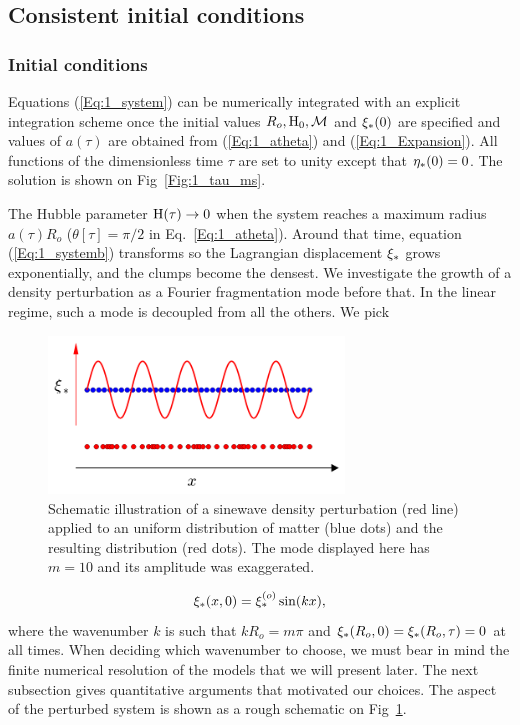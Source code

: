 \subsection{Consistent initial conditions} 
\subsubsection{Initial conditions} 
Equations (\ref{Eq:1_system}) can be numerically integrated with an explicit integration scheme once the initial values $R_o, {\textrm{H}}_0, {\cal M}$ and $\xi_\ast(0)$ are specified and values of $a(\tau)$ are obtained from (\ref{Eq:1_atheta}) and (\ref{Eq:1_Expansion}). All functions of the dimensionless time $\tau$ are set to unity except that $\eta_\ast(0) = 0$. The solution is shown on Fig~\ref{Fig:1_tau_ms}.


The Hubble parameter ${\textrm{H}}(\tau) \rightarrow 0$ when the system reaches a maximum radius $a(\tau)R_o$ ($\theta[\tau] = \pi/2$ in Eq.~\ref{Eq:1_atheta}). Around that time, equation (\ref{Eq:1_systemb}) transforms so the Lagrangian displacement $\xi_\ast$ grows exponentially, and the clumps become the densest. We investigate the growth of a density perturbation as a Fourier fragmentation mode before that. In the linear regime, such a mode is decoupled from all the others. We pick 

 \begin{figure}
	\center
 	\includegraphics[width=0.7\textwidth]{Figures/1_perturbation.png}
	\caption{Schematic illustration of a sinewave density perturbation (red line) applied to an uniform distribution of matter (blue dots) and the resulting distribution (red dots). The mode displayed here has $m=10$ and its amplitude was exaggerated.} 
	\label{Fig:1_perturbation}
\end{figure}

\begin{equation} 
\label{Eq:1_FourierMode} 
   \xi_\ast(x,0) = \xi_\ast^{(o)} \sin( kx ) ,
\end{equation}  
where the wavenumber $k$ is such that $k R_o = m \pi$ and $\xi_\ast(R_o,0) = \xi_\ast(R_o,\tau) = 0$ at all times. When deciding which wavenumber to choose, we must bear in mind the finite numerical resolution of the models that we will present later. The next subsection gives quantitative arguments that motivated our choices.  
The aspect of the perturbed system is shown as a rough schematic on Fig~\ref{Fig:1_perturbation}.

